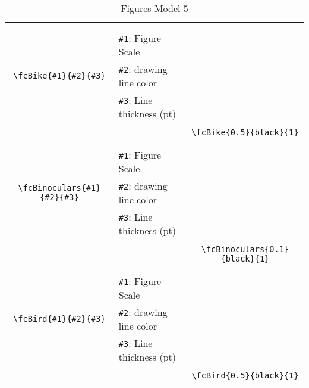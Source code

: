 \documentclass[x11names]{article}
\begin{document}
\begin{table}[H]
\begin{tabular}{|c|l|c|}
	&&\multirow{5}{*}{\fcBike{0.5}{black}{1}}\\	&&\\	&\verb|#1|: Figure Scale &\\	\verb|\fcBike{#1}{#2}{#3}|&	\verb|#2|: drawing line color &\\	&\verb|#3|: Line thickness (pt) &\\ &&\\&&	\verb|\fcBike{0.5}{black}{1}|\\\hline 	
	&&\multirow{5}{*}{\fcBinoculars{0.1}{black}{1}}\\	&&\\	&\verb|#1|: Figure Scale &\\	\verb|\fcBinoculars{#1}{#2}{#3}|&	\verb|#2|: drawing line color &\\	&\verb|#3|: Line thickness (pt) &\\ &&\\&&	\verb|\fcBinoculars{0.1}{black}{1}|\\\hline 	
	&&\multirow{5}{*}{\fcBird{0.5}{black}{1}}\\	&&\\	&\verb|#1|: Figure Scale &\\	\verb|\fcBird{#1}{#2}{#3}|&	\verb|#2|: drawing line color &\\	&\verb|#3|: Line thickness (pt) &\\ &&\\&&	\verb|\fcBird{0.5}{black}{1}|\\\hline 	\hline\end{tabular}\caption{Figures Model 5}\label{tab5}\end{table}
\end{document}
